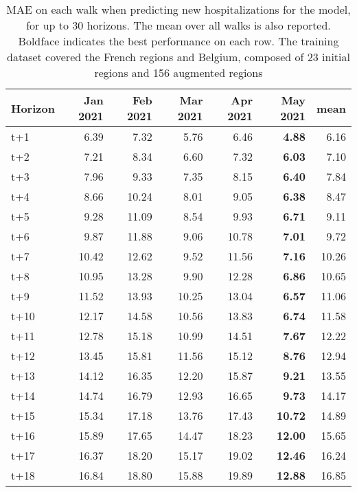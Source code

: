 \begin{table}[H]
\centering
\caption{MAE on each walk when predicting new hospitalizations for the model, for up to 30 horizons. The mean over all walks is also reported. Boldface indicates the best performance on each row. The training dataset covered the French regions and Belgium, composed of 23 initial regions and 156 augmented regions }
\label{tab:MAE_walk_custom_linear_regression}
\begin{tabular}{lrrrrrr}
\toprule
Horizon &  Jan 2021 &  Feb 2021 &  Mar 2021 &  Apr 2021 &  May 2021 &  mean \\
\midrule
t+1  & 6.39  & 7.32  & 5.76  & 6.46  & \textbf{4.88}  & 6.16  \\
t+2  & 7.21  & 8.34  & 6.60  & 7.32  & \textbf{6.03}  & 7.10  \\
t+3  & 7.96  & 9.33  & 7.35  & 8.15  & \textbf{6.40}  & 7.84  \\
t+4  & 8.66  & 10.24  & 8.01  & 9.05  & \textbf{6.38}  & 8.47  \\
t+5  & 9.28  & 11.09  & 8.54  & 9.93  & \textbf{6.71}  & 9.11  \\
t+6  & 9.87  & 11.88  & 9.06  & 10.78  & \textbf{7.01}  & 9.72  \\
t+7  & 10.42  & 12.62  & 9.52  & 11.56  & \textbf{7.16}  & 10.26  \\
t+8  & 10.95  & 13.28  & 9.90  & 12.28  & \textbf{6.86}  & 10.65  \\
t+9  & 11.52  & 13.93  & 10.25  & 13.04  & \textbf{6.57}  & 11.06  \\
t+10  & 12.17  & 14.58  & 10.56  & 13.83  & \textbf{6.74}  & 11.58  \\
t+11  & 12.78  & 15.18  & 10.99  & 14.51  & \textbf{7.67}  & 12.22  \\
t+12  & 13.45  & 15.81  & 11.56  & 15.12  & \textbf{8.76}  & 12.94  \\
t+13  & 14.12  & 16.35  & 12.20  & 15.87  & \textbf{9.21}  & 13.55  \\
t+14  & 14.74  & 16.79  & 12.93  & 16.65  & \textbf{9.73}  & 14.17  \\
t+15  & 15.34  & 17.18  & 13.76  & 17.43  & \textbf{10.72}  & 14.89  \\
t+16  & 15.89  & 17.65  & 14.47  & 18.23  & \textbf{12.00}  & 15.65  \\
t+17  & 16.37  & 18.20  & 15.17  & 19.02  & \textbf{12.46}  & 16.24  \\
t+18  & 16.84  & 18.80  & 15.88  & 19.89  & \textbf{12.88}  & 16.85  \\

\end{tabular}
\end{table}
